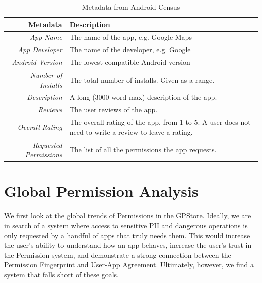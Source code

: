 \begin{table}[h]
\begin{small}
\begin{tabular}{r|l}
Metadata & Description \\
\hline

\textit{App Name} & The name of the app, e.g. Google Maps  \\
\textit{App Developer} & The name of the developer, e.g. Google  \\
\textit{Android Version} & The lowest compatible Android version  \\
\textit{Number of Installs} &  The total number of installs. Given as a range. \\
\textit{Description} &  A long (3000 word max) description of the app. \\
\textit{Reviews} &  The user reviews of the app. \\
\textit{Overall Rating} &  The overall rating of the app, from 1 to 5. A user does not need to write a review to leave a rating. \\
\textit{Requested Permissions} &  The list of all the permissions the app requests. \\

\end{tabular}
\end{small}
\caption{Metadata from Android Census}
\label{tab:marketmetadata}
\end{table}



\section{Global Permission Analysis}
We first look at the global trends of Permissions in the GPStore. Ideally, we are in search of a system where access to sensitive PII and dangerous operations is only requested by a handful of apps that truly needs them. This would increase the user's ability to understand how an app behaves, increase the user's trust in the Permission system, and demonstrate a strong connection between the Permission Fingerprint and User-App Agreement. Ultimately, however, we find a system that falls short of these goals.


